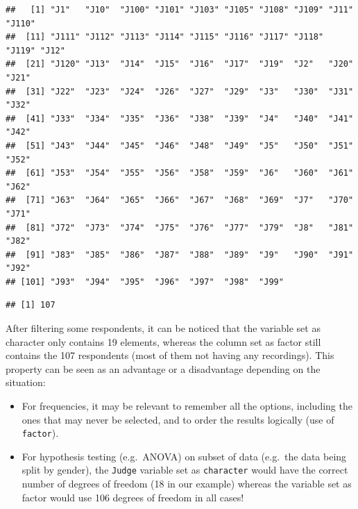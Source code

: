 \documentclass[
]{book}
\newenvironment{Shaded}{\begin{snugshade}}{\end{snugshade}}
\newcommand{\FunctionTok}[1]{\textcolor[rgb]{0.00,0.00,0.00}{#1}}
\newcommand{\NormalTok}[1]{#1}
\newcommand{\SpecialCharTok}[1]{\textcolor[rgb]{0.00,0.00,0.00}{#1}}
\providecommand{\tightlist}{%
  \setlength{\itemsep}{0pt}\setlength{\parskip}{0pt}}
\begin{document}
\begin{verbatim}
##   [1] "J1"   "J10"  "J100" "J101" "J103" "J105" "J108" "J109" "J11"  "J110"
##  [11] "J111" "J112" "J113" "J114" "J115" "J116" "J117" "J118" "J119" "J12" 
##  [21] "J120" "J13"  "J14"  "J15"  "J16"  "J17"  "J19"  "J2"   "J20"  "J21" 
##  [31] "J22"  "J23"  "J24"  "J26"  "J27"  "J29"  "J3"   "J30"  "J31"  "J32" 
##  [41] "J33"  "J34"  "J35"  "J36"  "J38"  "J39"  "J4"   "J40"  "J41"  "J42" 
##  [51] "J43"  "J44"  "J45"  "J46"  "J48"  "J49"  "J5"   "J50"  "J51"  "J52" 
##  [61] "J53"  "J54"  "J55"  "J56"  "J58"  "J59"  "J6"   "J60"  "J61"  "J62" 
##  [71] "J63"  "J64"  "J65"  "J66"  "J67"  "J68"  "J69"  "J7"   "J70"  "J71" 
##  [81] "J72"  "J73"  "J74"  "J75"  "J76"  "J77"  "J79"  "J8"   "J81"  "J82" 
##  [91] "J83"  "J85"  "J86"  "J87"  "J88"  "J89"  "J9"   "J90"  "J91"  "J92" 
## [101] "J93"  "J94"  "J95"  "J96"  "J97"  "J98"  "J99"
\end{verbatim}

\begin{Shaded}
\end{Shaded}

\begin{verbatim}
## [1] 107
\end{verbatim}

After filtering some respondents, it can be noticed that the variable set as character only contains 19 elements, whereas the column set as factor still contains the 107 respondents (most of them not having any recordings). This property can be seen as an advantage or a disadvantage depending on the situation:

\begin{itemize}
\tightlist
\item
  For frequencies, it may be relevant to remember all the options, including the ones that may never be selected, and to order the results logically (use of \texttt{factor}).
\item
  For hypothesis testing (e.g.~ANOVA) on subset of data (e.g.~the data being split by gender), the \texttt{Judge} variable set as \texttt{character} would have the correct number of degrees of freedom (18 in our example) whereas the variable set as factor would use 106 degrees of freedom in all cases!
\end{itemize}
\end{document}
